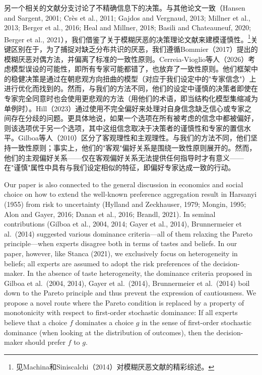 \documentclass[12pt,a4paper]{article}
\newenvironment{original}
  {\par\noindent\ignorespaces}
  {\par}
\newenvironment{translation}
  {\par\noindent{\color{transblue}\ignorespaces}}
  {\par\medskip}
\begin{document}
\begin{translation}
另一个相关的文献分支讨论了不精确信息下的决策。与其他论文一致（Hansen and Sargent, 2001; Crès et al., 2011; Gajdos and Vergnaud, 2013; Millner et al., 2013; Berger et al., 2016; Heal and Millner, 2018; Basili and Chateauneuf, 2020; Berger et al., 2021），我们借鉴了关于模糊厌恶的决策理论文献来建模谨慎性。\footnote{见Machina和Siniscalchi（2014）对模糊厌恶文献的精彩综述。}关键区别在于，为了捕捉对缺乏分布共识的厌恶，我们遵循Bommier（2017）提出的模糊厌恶对偶方法，并偏离了标准的一致性原则。Cerreia-Vioglio等人（2026）考虑模型误设的可能性，即所有专家可能都错了，也放弃了一致性原则。他们框架中的稳健决策是通过在朝悲观方向扭曲的模型（对应于我们设定中的"专家信念"）上进行优化而找到的。然而，与我们的方法不同，他们的设定中谨慎的决策者即使在专家完全同意时也会使用更悲观的方法（用他们的术语，即当结构化模型集缩减为单例时）。Hill（2023）通过使用不完全偏好来处理对自身信念缺乏信心或专家之间存在分歧的问题。更具体地说，如果一个选项在所有被考虑的信念中都被偏好，则该选项优于另一个选项，其中这组信念取决于决策者的谨慎性和专家的置信水平。Gilboa等人（2010）区分了客观理性和主观理性。与我们的方法不同，他们坚持一致性原则；事实上，他们的"客观"偏好关系是围绕一致性原则展开的。然而，他们的主观偏好关系——仅在客观偏好关系无法提供任何指导时才有意义——在"谨慎"属性中具有与我们设定相似的特征，即偏好专家达成一致的行动。
\end{translation}

\begin{original}
Our paper is also connected to the general discussion in economics and social choice on how to extend the well-known preference aggregation result in Harsanyi (1955) from risk to uncertainty (Hylland and Zeckhauser, 1979; Mongin, 1995; Alon and Gayer, 2016; Danan et al., 2016; Brandl, 2021). In seminal contributions (Gilboa et al., 2004, 2014; Gayer et al., 2014), Brunnermeier et al.\ (2014) suggested various dominance criteria---all of them relaxing the Pareto principle---when experts disagree both in terms of tastes and beliefs. In our paper, however, like Stanca (2021), we exclusively focus on heterogeneity in beliefs; all experts are assumed to adopt the risk preferences of the decision-maker. In the absence of taste heterogeneity, the dominance criteria proposed in Gilboa et al.\ (2004, 2014), Gayer et al.\ (2014), Brunnermeier et al.\ (2014) boil down to the Pareto principle and thus prevent the expression of cautiousness. We propose a novel route where the Pareto condition is replaced by a property of monotonicity with respect to first-order stochastic dominance: If all experts believe that a choice $f$ dominates a choice $g$ in the sense of first-order stochastic dominance (when looking at the distribution of outcomes), then the decision-maker should prefer $f$ to $g$.
\end{original}
\end{document}
